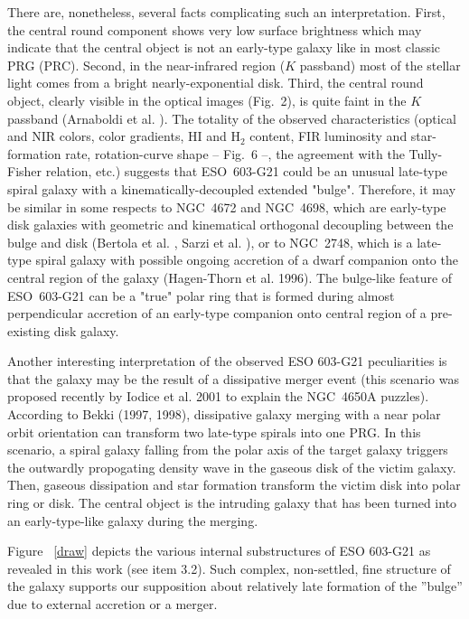\documentclass{aa}
\begin{document}
There are, nonetheless,  several facts  complicating such an interpretation.
First, the central round component shows very low surface  brightness which
may indicate that the central  object is not an  early-type  galaxy  
like in most classic PRG (PRC). 
Second, in the  near-infrared  region  ($K$  passband)  most of the stellar
light  comes from a bright  nearly-exponential  disk.  Third,  the  central
round  object,  clearly  visible in the optical  images  (Fig.~2), is quite
faint in the $K$ passband  (Arnaboldi  et al.  \cite{a}).  The  totality of
the observed  characteristics  (optical and NIR colors, color gradients, HI
and H$_2$ content, FIR luminosity and star-formation  rate,  rotation-curve
shape -- Fig.~6 --, the agreement  with the  Tully-Fisher  relation,  etc.)
suggests that ESO~603-G21 could be an unusual late-type spiral galaxy with
a kinematically-decoupled  extended "bulge".  Therefore, it may be similar 
in some respects to
NGC~4672 and NGC~4698,  which are early-type  disk galaxies with  geometric
and kinematical  orthogonal  decoupling between the bulge and disk (Bertola
et  al.  \cite{b},   Sarzi  et  al.  \cite{sa}),  or to NGC~2748,
which is a late-type spiral galaxy with possible ongoing accretion of a dwarf
companion onto the central region of the galaxy (Hagen-Thorn et al. 1996).  
The bulge-like feature of ESO~603-G21 can be a "true" polar ring that 
is formed during almost  perpendicular  accretion  of an
early-type companion onto central region of a pre-existing disk galaxy.


Another interesting  interpretation  of  the  observed  ESO  603-G21
peculiarities is that the galaxy may be the result of a dissipative  merger
event  (this  scenario  was  proposed  recently  by Iodice  et al.  2001 to
explain  the   NGC~4650A   puzzles).  According  to  Bekki  (1997,   1998),
dissipative  galaxy  merging  with  a  near  polar  orbit  orientation  can
transform two late-type  spirals into one PRG.  In this  scenario, a spiral
galaxy  falling  from the polar  axis of the  target  galaxy  triggers  the
outwardly  propogating  density  wave in the  gaseous  disk  of the  victim
galaxy.  Then, gaseous dissipation and star formation  transform the victim
disk into polar ring or disk.  The central  object is the intruding  galaxy
that has been turned into an early-type-like galaxy during the merging.

Figure ~\ref{draw}  depicts  the
various  internal  substructures  of ESO 603-G21 as  revealed  in this
work (see item 3.2). Such complex, non-settled, fine structure of the
galaxy  supports our supposition about relatively late formation
of the ''bulge'' due to external accretion or a merger.
\end{document}
